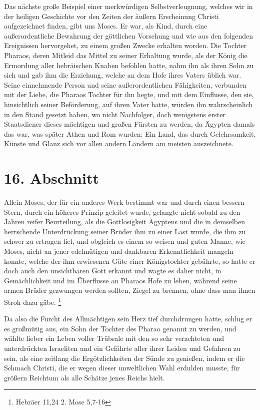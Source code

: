 Das nächste große Beispiel einer merkwürdigen
Selbstverleugnung, welches wir in
der heiligen Geschichte vor den Zeiten der äußern Erscheinung Christi
aufgezeichnet finden, gibt uns Moses. Er war, als Kind, durch eine
außerordentliche Bewahrung der göttlichen Vorsehung und wie aus den folgenden
Ereignissen hervorgehet, zu einem großen Zwecke erhalten worden. Die Tochter
Pharaos,  deren Mitleid das Mittel zu seiner Erhaltung wurde, als der König die
Ermordung aller hebräischen Knaben befohlen hatte, nahm ihn als ihren Sohn zu
sich und gab ihm die Erziehung, welche an dem Hofe ihres Vaters üblich war.
Seine einnehmende Person und seine außerordentlichen Fähigkeiten, verbunden mit
der Liebe, die Pharaos Tochter für ihn hegte, und mit dem Einflusse, den sie,
hinsichtlich seiner Beförderung, auf ihren Vater hatte, würden ihn
wahrscheinlich in den Stand gesetzt haben, wo nicht Nachfolger, doch wenigstens
erster Staatsdiener dieses mächtigen und großen Fürsten zu werden, da
Ägypten  damals das war, was später Athen
 und Rom  wurden: Ein Land, das
durch Gelehrsamkeit, Künste und Glanz sich vor allen andern Ländern am meisten
auszeichnete.

\section{16. Abschnitt} \label{kap4_ab16}

Allein Moses, der für ein anderes Werk bestimmt war und durch einen bessern
Stern, durch ein höheres Prinzip geleitet wurde, gelangte nicht sobald zu den
Jahren reifer Beurteilung, als die Gottlosigkeit Ägyptens und die in demselben
herrschende Unterdrückung seiner Brüder ihm zu einer Last wurde, die ihm zu
schwer zu ertragen fiel, und obgleich es einem so weisen und guten Manne, wie
Moses, nicht an jener edelmütigen und dankbaren Erkenntlichkeit mangeln
konnte, welche der ihm erwiesenen Güte einer Königstochter gebührte, so hatte er
doch auch den unsichtbaren Gott erkannt und wagte es daher nicht, in
Gemächlichkeit und im Überflusse an Pharaos Hofe zu leben, während seine armen
Brüder gezwungen werden sollten, Ziegel zu brennen, ohne dass man ihnen Stroh
dazu gäbe.
\footnote{Hebräer 11,24 2. Mose 5,7-16}

\medskip

Da also die Furcht des Allmächtigen sein Herz tief durchdrungen hatte, schlug er
es großmütig aus, ein Sohn der Tochter des Pharao genannt zu werden, und wählte
lieber ein Leben voller Trübsale mit den so sehr verachteten und unterdrückten
Israeliten und ein Gefährte aller ihrer Leiden und Gefahren zu sein, als eine
zeitlang die Ergötzlichkeiten der Sünde zu genießen, indem er die Schmach
Christi, die er wegen dieser unweltlichen Wahl erdulden musste, für größern
Reichtum als alle Schätze jenes Reichs hielt.

